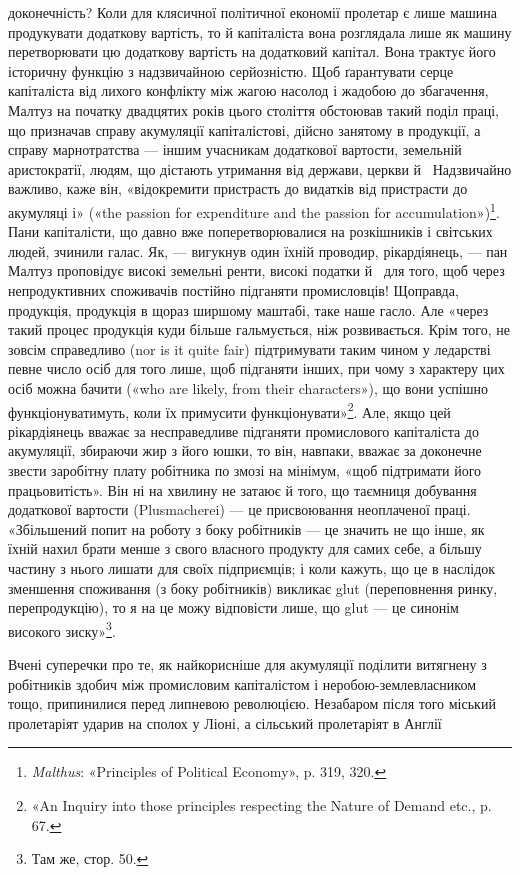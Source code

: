 \parcont{}  %
доконечність? Коли для клясичної політичної економії пролетар
є лише машина продукувати додаткову вартість, то
й капіталіста вона розглядала лише як машину перетворювати
цю додаткову вартість на додатковий капітал. Вона трактує
його історичну функцію з надзвичайною серйозністю. Щоб ґарантувати
серце капіталіста від лихого конфлікту між жагою
насолод і жадобою до збагачення, Малтуз на початку двадцятих
років цього століття обстоював такий поділ праці, що призначав
справу акумуляції капіталістові, дійсно занятому в продукції,
а справу марнотратства — іншим учасникам додаткової вартости,
земельній аристократії, людям, що дістають утримання від держави,
церкви й~ Надзвичайно важливо, каже він, «відокремити
пристрасть до видатків від пристрасти до акумуляці і» («the
passion for expenditure and the passion for accumulation»)\footnote{
\emph{Malthus}: «Principles of Political Economy», p. 319, 320.
}.
Пани капіталісти, що давно вже поперетворювалися на розкішників
і світських людей, зчинили галас. Як, — вигукнув один
їхній проводир, рікардіянець, — пан Малтуз проповідує високі
земельні ренти, високі податки й~ для того, щоб через непродуктивних
споживачів постійно підганяти промисловців! Щоправда,
продукція, продукція в щораз ширшому маштабі, таке
наше гасло. Але «через такий процес продукція куди більше
гальмується, ніж розвивається. Крім того, не зовсім справедливо
(nor is it quite fair) підтримувати таким чином у ледарстві певне
число осіб для того лише, щоб підганяти інших, при чому з характеру
цих осіб можна бачити («who are likely, from their characters»),
що вони успішно функціонуватимуть, коли їх примусити
функціонувати»\footnote{
«An Inquiry into those principles respecting the Nature of Demand
etc., p. 67.
}. Але, якщо цей рікардіянець вважає за несправедливе
підганяти промислового капіталіста до акумуляції,
збираючи жир з його юшки, то він, навпаки, вважає за доконечне
звести заробітну плату робітника по змозі на мінімум,
«щоб підтримати його працьовитість». Він ні на хвилину не
затаює й того, що таємниця добування додаткової вартости
(Plusmacherei) — це присвоювання неоплаченої праці. «Збільшений
попит на роботу з боку робітників — це значить не що
інше, як їхній нахил брати менше з свого власного продукту для
самих себе, а більшу частину з нього лишати для своїх підприємців;
і коли кажуть, що це в наслідок зменшення споживання
(з боку робітників) викликає glut (переповнення ринку, перепродукцію),
то я на це можу відповісти лише, що glut — це синонім
високого зиску»\footnote{
Там же, стор. 50.
}.

Вчені суперечки про те, як найкорисніше для акумуляції
поділити витягнену з робітників здобич між промисловим капіталістом
і неробою-землевласником тощо, припинилися перед
липневою революцією. Незабаром після того міський пролетаріят
ударив на сполох у Ліоні, а сільський пролетаріят в Англії
\parbreak{}  %
